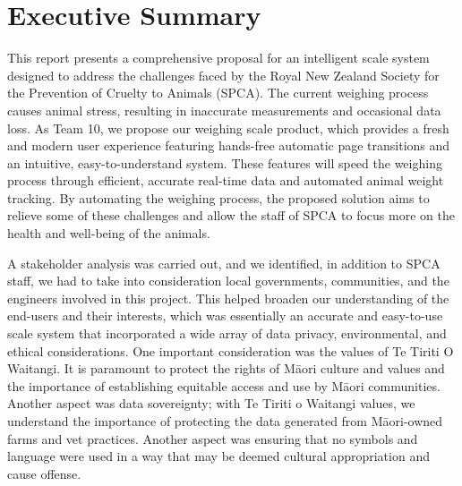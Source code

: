 
\chapter{Executive Summary}
This report presents a comprehensive proposal for an intelligent scale system designed to address the challenges faced by the Royal New Zealand Society for the Prevention of Cruelty to Animals (SPCA). The current weighing process causes animal stress, resulting in inaccurate measurements and occasional data loss. As Team 10, we propose our weighing scale product, which provides a fresh and modern user experience featuring hands-free automatic page transitions and an intuitive, easy-to-understand system. These features will speed the weighing process through efficient, accurate real-time data and automated animal weight tracking. By automating the weighing process, the proposed solution aims to relieve some of these challenges and allow the staff of SPCA to focus more on the health and well-being of the animals.

A stakeholder analysis was carried out, and we identified, in addition to SPCA staff, we had to take into consideration local governments, communities, and the engineers involved in this project. This helped broaden our understanding of the end-users and their interests, which was essentially an accurate and easy-to-use scale system that incorporated a wide array of data privacy, environmental, and ethical considerations. One important consideration was the values of Te Tiriti O Waitangi. It is paramount to protect the rights of Māori culture and values and the importance of establishing equitable access and use by Māori communities. Another aspect was data sovereignty; with Te Tiriti o Waitangi values, we understand the importance of protecting the data generated from Māori-owned farms and vet practices. Another aspect was ensuring that no symbols and language were used in a way that may be deemed cultural appropriation and cause offense.

